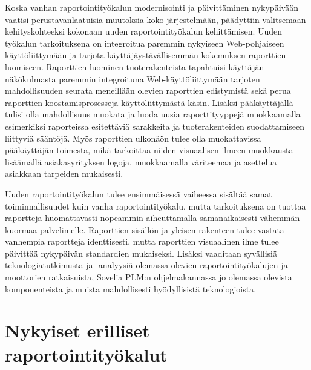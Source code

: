 Koska vanhan raportointityökalun modernisointi ja päivittäminen nykypäivään vaatisi perustavanlaatuisia muutoksia koko järjestelmään, päädyttiin valitsemaan kehityskohteeksi kokonaan uuden raportointityökalun kehittämisen. Uuden työkalun tarkoituksena on integroitua paremmin nykyiseen Web-pohjaiseen käyttöliittymään ja tarjota käyttäjäystävällisemmän kokemuksen raporttien luomiseen. Raporttien luominen tuoterakenteista tapahtuisi käyttäjän näkökulmasta paremmin integroituna Web-käyttöliittymään tarjoten mahdollisuuden seurata meneillään olevien raporttien edistymistä sekä perua raporttien koostamisprosesseja käyttöliittymästä käsin. Lisäksi pääkäyttäjällä tulisi olla mahdollisuus muokata ja luoda uusia raporttityyppejä muokkaamalla esimerkiksi raporteissa esitettäviä sarakkeita ja tuoterakenteiden suodattamiseen liittyviä sääntöjä. Myös raporttien ulkonäön tulee olla muokattavissa pääkäyttäjän toimesta, mikä tarkoittaa niiden visuaalisen ilmeen muokkausta lisäämällä asiakasyrityksen logoja, muokkaamalla väriteemaa ja asettelua asiakkaan tarpeiden mukaisesti.

Uuden raportointityökalun tulee ensimmäisessä vaiheessa sisältää samat toiminnallisuudet kuin vanha raportointityökalu, mutta tarkoituksena on tuottaa raportteja huomattavasti nopeammin aiheuttamalla samanaikaisesti vähemmän kuormaa palvelimelle. Raporttien sisällön ja yleisen rakenteen tulee vastata vanhempia raportteja identtisesti, mutta raporttien visuaalinen ilme tulee päivittää nykypäivän standardien mukaiseksi. Lisäksi vaaditaan syvällisiä teknologiatutkimusta ja -analyysiä olemassa olevien raportointityökalujen ja -moottorien ratkaisuista, Sovelia PLM:n ohjelmakannassa jo olemassa olevista komponenteista ja muista mahdollisesti hyödyllisistä teknologioista.

\section{Nykyiset erilliset raportointityökalut} \label{Nykyiset erilliset}

